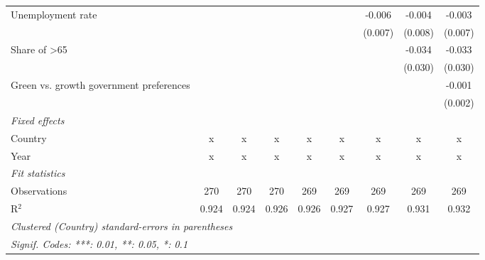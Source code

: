 \begin{table}[htbp]
\begin{tabular}{lcccccccc}
      Unemployment rate                                        &         &         &         &         &         & -0.006  & -0.004  & -0.003\\   
                                                               &         &         &         &         &         & (0.007) & (0.008) & (0.007)\\   
      Share of >65                                             &         &         &         &         &         &         & -0.034  & -0.033\\   
                                                               &         &         &         &         &         &         & (0.030) & (0.030)\\   
      Green vs. growth government preferences                  &         &         &         &         &         &         &         & -0.001\\   
                                                               &         &         &         &         &         &         &         & (0.002)\\   
      \emph{Fixed effects}\\
      Country                                                  & x       & x       & x       & x       & x       & x       & x       & x\\  
      Year                                                     & x       & x       & x       & x       & x       & x       & x       & x\\  
      \midrule \emph{Fit statistics}\\
      Observations                                             & 270     & 270     & 270     & 269     & 269     & 269     & 269     & 269\\  
      R$^2$                                                    & 0.924   & 0.924   & 0.926   & 0.926   & 0.927   & 0.927   & 0.931   & 0.932\\  
      \midrule
      \multicolumn{9}{l}{\emph{Clustered (Country) standard-errors in parentheses}}\\
      \multicolumn{9}{l}{\emph{Signif. Codes: ***: 0.01, **: 0.05, *: 0.1}}\\
   \end{tabular}
\end{table}


